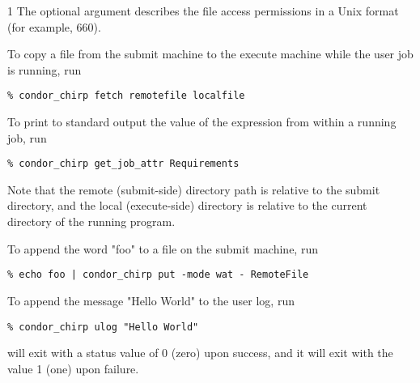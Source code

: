 \begin{ManPage}{\label{man-condor-chirp}}{1}
The optional  argument
describes the file access permissions in a Unix format
(for example, 660).

\begin{Options}
\end{Options}

\Examples

To copy a file from the submit machine to the execute machine while the 
user job is running, run

\footnotesize
\begin{verbatim}
% condor_chirp fetch remotefile localfile
\end{verbatim}
\normalsize

To print to standard output the value of the 
expression from within a running job, run

\footnotesize
\begin{verbatim}
% condor_chirp get_job_attr Requirements
\end{verbatim}
\normalsize

Note that the remote (submit-side) directory path is relative to the
submit directory, and the local (execute-side) directory is relative to the
current directory of the running program.

To append the word "foo" to a file on the submit machine, run

\footnotesize
\begin{verbatim}
% echo foo | condor_chirp put -mode wat - RemoteFile
\end{verbatim}
\normalsize

To append the message "Hello World" to the user log, run

\footnotesize
\begin{verbatim}
% condor_chirp ulog "Hello World"
\end{verbatim}
\normalsize

\ExitStatus

 will exit with a status value of 0 (zero) upon success,
and it will exit with the value 1 (one) upon failure.

\end{ManPage}
